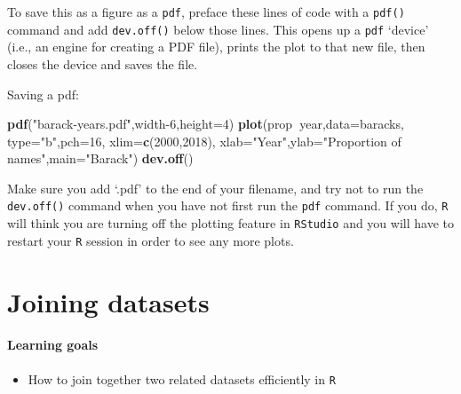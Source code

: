 \documentclass[]{book}
\newenvironment{Shaded}{\begin{snugshade}}{\end{snugshade}}
\newcommand{\DataTypeTok}[1]{\textcolor[rgb]{0.13,0.29,0.53}{#1}}
\newcommand{\DecValTok}[1]{\textcolor[rgb]{0.00,0.00,0.81}{#1}}
\newcommand{\KeywordTok}[1]{\textcolor[rgb]{0.13,0.29,0.53}{\textbf{#1}}}
\newcommand{\NormalTok}[1]{#1}
\newcommand{\OperatorTok}[1]{\textcolor[rgb]{0.81,0.36,0.00}{\textbf{#1}}}
\newcommand{\StringTok}[1]{\textcolor[rgb]{0.31,0.60,0.02}{#1}}
\providecommand{\tightlist}{%
  \setlength{\itemsep}{0pt}\setlength{\parskip}{0pt}}
\begin{document}
To save this as a figure as a \texttt{pdf}, preface these lines of code with a \texttt{pdf()} command and add \texttt{dev.off()} below those lines. This opens up a \texttt{pdf} `device' (i.e., an engine for creating a PDF file), prints the plot to that new file, then closes the device and saves the file.

Saving a pdf:

\begin{Shaded}
\begin{Highlighting}[]
\KeywordTok{pdf}\NormalTok{(}\StringTok{"barack-years.pdf"}\NormalTok{,width}\DecValTok{-6}\NormalTok{,}\DataTypeTok{height=}\DecValTok{4}\NormalTok{)}
\KeywordTok{plot}\NormalTok{(prop}\OperatorTok{~}\NormalTok{year,}\DataTypeTok{data=}\NormalTok{baracks,}
     \DataTypeTok{type=}\StringTok{"b"}\NormalTok{,}\DataTypeTok{pch=}\DecValTok{16}\NormalTok{,}
     \DataTypeTok{xlim=}\KeywordTok{c}\NormalTok{(}\DecValTok{2000}\NormalTok{,}\DecValTok{2018}\NormalTok{),}
     \DataTypeTok{xlab=}\StringTok{"Year"}\NormalTok{,}\DataTypeTok{ylab=}\StringTok{"Proportion of names"}\NormalTok{,}\DataTypeTok{main=}\StringTok{"Barack"}\NormalTok{)}
\KeywordTok{dev.off}\NormalTok{()}
\end{Highlighting}
\end{Shaded}

Make sure you add `.pdf' to the end of your filename, and try not to run the \texttt{dev.off()} command when you have not first run the \texttt{pdf} command. If you do, \texttt{R} will think you are turning off the plotting feature in \texttt{RStudio} and you will have to restart your \texttt{R} session in order to see any more plots.

\hypertarget{joining_datasets}{%
\chapter{Joining datasets}\label{joining_datasets}}

\hypertarget{learning-goals-29}{%
\subsubsection*{Learning goals}\label{learning-goals-29}}

\begin{itemize}
\tightlist
\item
  How to join together two related datasets efficiently in \texttt{R}
\end{itemize}
\end{document}
